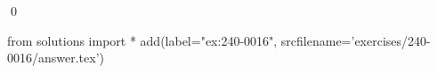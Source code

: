 
\begin{ex} 
  \label{ex:240-0016}
  
  \qed
\end{ex} 
\begin{python0}
from solutions import *
add(label="ex:240-0016",
    srcfilename='exercises/240-0016/answer.tex') 
\end{python0}
